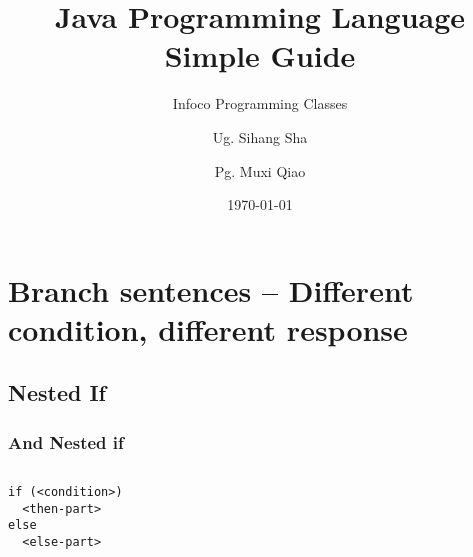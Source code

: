 \documentclass[en, 11pt, xcolor=dvipsnames]{beamer}
\title{Java Programming Language \\ Simple Guide} %
\subtitle{Infoco Programming Classes} %
\author{Ug. Sihang Sha \and Pg. Muxi Qiao} %
\institute{Xiann' Jiaotong Livepool University \\ \smallskip \textit{infoco@xjtlu.edu.cn}} %
\date{\today} %
\begin{document}
\maketitle


\section{Branch sentences -- Different condition, different response}

\subsection{Nested If}
\begin{frame}[fragile]
	\frametitle{And Nested if}



	\begin{columns}[c]
		\begin{column}{0.98\textwidth}

			\begin{lstlisting}[style=Java]
if (<condition>)
  <then-part>
else
  <else-part>\end{lstlisting}


		\end{column}
	\end{columns}

\end{frame}
\end{document}
